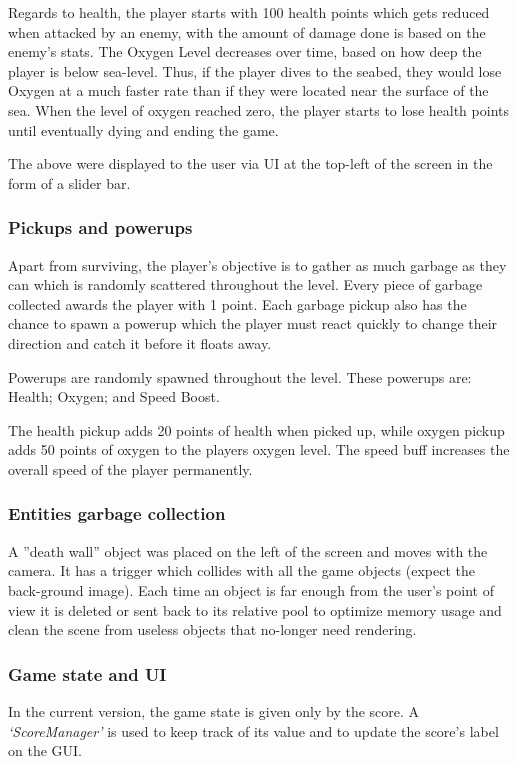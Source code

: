 \documentclass[11pt]{article}
\begin{document}
Regards to health, the player starts with 100 health points which gets reduced when attacked by an enemy, with the amount of damage done is based on the enemy’s stats. The Oxygen Level decreases over time, based on how deep the player is below sea-level. Thus, if the player dives to the seabed, they would lose Oxygen at a much faster rate than if they were located near the surface of the sea. When the level of oxygen reached zero, the player starts to lose health points until eventually dying and ending the game.

The above were displayed to the user via UI at the top-left of the screen in the form of a slider bar.

\subsubsection{Pickups and powerups}
Apart from surviving, the player’s objective is to gather as much garbage as they can which is randomly scattered throughout the level. Every piece of garbage collected awards the player with 1 point. Each garbage pickup also has the chance to spawn a powerup which the player must react quickly to change their direction and catch it before it floats away.

Powerups are randomly spawned throughout the level. These powerups are: Health; Oxygen; and Speed Boost.

The health pickup adds 20 points of health when picked up, while oxygen pickup adds 50 points of oxygen to the players oxygen level. The speed buff increases the overall speed of the player permanently.

\subsubsection{Entities garbage collection}
A ”death wall” object was placed on the left of the screen and moves with the camera. It has a trigger which collides with all the game objects (expect the back-ground image). Each time an object is far enough from the user’s point of view it is deleted or sent back to its relative pool to optimize memory usage and clean the scene from useless objects that no-longer need rendering.

\subsubsection{Game state and UI}
In the current version, the game state is given only by the score. A \textit{‘ScoreManager’} is used to keep track of its value and to update the score’s label on the GUI.
\end{document}
